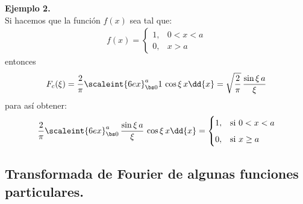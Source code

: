 \noindent
\textbf{Ejemplo 2.}
\\
Si hacemos que la función $f (x)$ sea tal que:
\begin{align*}
f (x) = \begin{cases}
1, & 0 < x < a \\[0.5em]
0, & x > a
\end{cases}
\end{align*}
entonces
\begin{align*}
F_{c}(\xi) = \dfrac{2}{\pi} \scaleint{6ex}_{\bs 0}^{a} 1 \, \cos \xi \, x \dd{x} = \sqrt{\dfrac{2}{\pi}} \, \dfrac{\sin \xi \, a}{\xi}
\end{align*}
para así obtener:
\begin{align*}
\dfrac{2}{\pi} \scaleint{6ex}_{\bs 0}^{a} \, \dfrac{\sin \xi \, a}{\xi} \, \cos \xi \, x \dd{x} = \begin{cases}
1, & \mbox{si } 0 < x < a \\[0.5em]
0, & \mbox{si } x \geq a
\end{cases}
\end{align*}

\subsection{Transformada de Fourier de algunas funciones particulares.}

